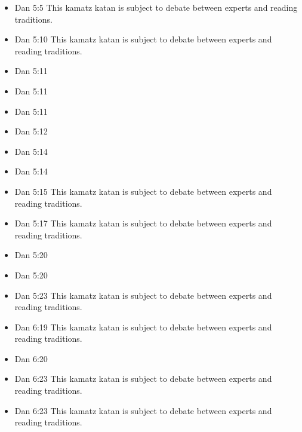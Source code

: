 \documentclass[14pt]{book}
\begin{document}
\begin{multicols}{2}
\begin{itemize}
\item Dan 5:5 This kamatz katan is subject to debate between experts and reading traditions.

\item Dan 5:10 This kamatz katan is subject to debate between experts and reading traditions.

\item Dan 5:11

\item Dan 5:11

\item Dan 5:11

\item Dan 5:12

\item Dan 5:14

\item Dan 5:14

\item Dan 5:15 This kamatz katan is subject to debate between experts and reading traditions.

\item Dan 5:17 This kamatz katan is subject to debate between experts and reading traditions.

\item Dan 5:20

\item Dan 5:20

\item Dan 5:23 This kamatz katan is subject to debate between experts and reading traditions.

\item Dan 6:19 This kamatz katan is subject to debate between experts and reading traditions.

\item Dan 6:20

\item Dan 6:23 This kamatz katan is subject to debate between experts and reading traditions.

\item Dan 6:23 This kamatz katan is subject to debate between experts and reading traditions.


\end{itemize}
\end{multicols}
\end{document}
